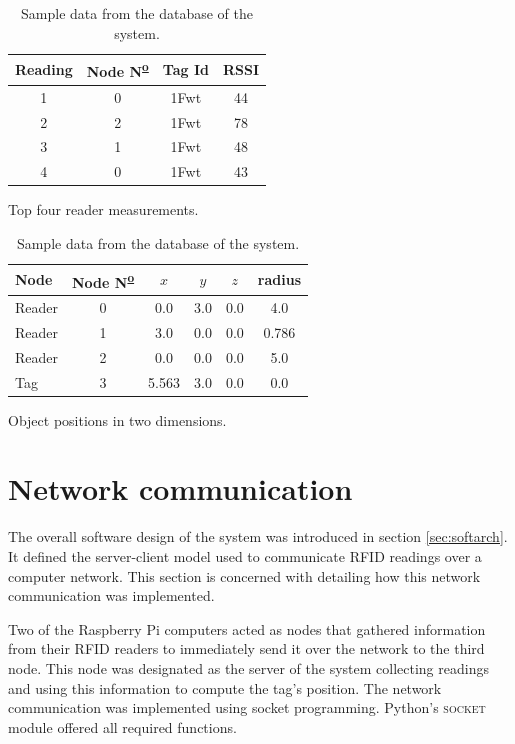 \begin{table}[h]
	\centering
	\begin{subtable}[b]{1\textwidth}
	\centering
	\begin{tabular}{|c|c|c|c|}
		\hline
		Reading & Node N\textsuperscript{\underline{o}} & Tag Id 	& RSSI	\\ \hline
		1		& 0										& 1Fwt		& 44	\\ \hline
		2		& 2										& 1Fwt		& 78	\\ \hline
		3		& 1										& 1Fwt		& 48	\\ \hline
		4		& 0										& 1Fwt		& 43	\\ \hline
	\end{tabular}
	\caption{Top four reader measurements.}
	\end{subtable}
	
	\begin{subtable}[b]{1\textwidth}
	\centering
	\begin{tabular}{|l|c|c|c|c|c|}
		\hline
		Node	& Node N\textsuperscript{\underline{o}} & $x$ 	& $y$ & $z$ & radius	\\ \hline
		Reader	& 0 									& 0.0 	& 3.0 & 0.0 & 4.0		\\ \hline
		Reader	& 1 									& 3.0 	& 0.0 & 0.0 & 0.786		\\ \hline
		Reader	& 2 									& 0.0 	& 0.0 & 0.0 & 5.0		\\ \hline
		Tag		& 3 									& 5.563 & 3.0 & 0.0 & 0.0		\\ \hline
	\end{tabular}
	\caption{Object positions in two dimensions.}
	\end{subtable}
	
	\caption{Sample data from the database of the system.}
	\label{tbl:sample}
\end{table}


\section{Network communication}
\label{sec:netcomm}

The overall software design of the system was introduced in section \ref{sec:softarch}. It defined the server-client model used to communicate RFID readings over a computer network. This section is concerned with detailing how this network communication was implemented.

Two of the Raspberry Pi computers acted as nodes that gathered information from their RFID readers to immediately send it over the network to the third node. This node was designated as the server of the system collecting readings and using this information to compute the tag's position. The network communication was implemented using socket programming. Python's \textsc{socket} module offered all required functions.

